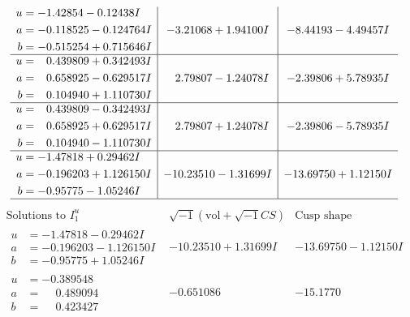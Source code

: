 \documentclass[1p]{elsarticle_modified}
\theoremstyle{definition}
\newcommand{\I}{\sqrt{-1}}
\begin{document}
$$\begin{array}{c|c|c}
\begin{aligned}
u &= -1.42854 - 0.12438 I \\
a &= -0.118525 - 0.124764 I \\
b &= -0.515254 + 0.715646 I\end{aligned}
 & -3.21068 + 1.94100 I & -8.44193 - 4.49457 I \\ \hline\begin{aligned}
u &= \phantom{-}0.439809 + 0.342493 I \\
a &= \phantom{-}0.658925 - 0.629517 I \\
b &= \phantom{-}0.104940 + 1.110730 I\end{aligned}
 & \phantom{-}2.79807 - 1.24078 I & -2.39806 + 5.78935 I \\ \hline\begin{aligned}
u &= \phantom{-}0.439809 - 0.342493 I \\
a &= \phantom{-}0.658925 + 0.629517 I \\
b &= \phantom{-}0.104940 - 1.110730 I\end{aligned}
 & \phantom{-}2.79807 + 1.24078 I & -2.39806 - 5.78935 I \\ \hline\begin{aligned}
u &= -1.47818 + 0.29462 I \\
a &= -0.196203 + 1.126150 I \\
b &= -0.95775 - 1.05246 I\end{aligned}
 & -10.23510 - 1.31699 I & -13.69750 + 1.12150 I\\
 \hline 
 \end{array}$$\newpage$$\begin{array}{c|c|c}  
\text{Solutions to }I^u_{1}& \I (\text{vol} + \sqrt{-1}CS) & \text{Cusp shape}\\
 \hline 
\begin{aligned}
u &= -1.47818 - 0.29462 I \\
a &= -0.196203 - 1.126150 I \\
b &= -0.95775 + 1.05246 I\end{aligned}
 & -10.23510 + 1.31699 I & -13.69750 - 1.12150 I \\ \hline\begin{aligned}
u &= -0.389548\phantom{ +0.000000I} \\
a &= \phantom{-}0.489094\phantom{ +0.000000I} \\
b &= \phantom{-}0.423427\phantom{ +0.000000I}\end{aligned}
 & -0.651086\phantom{ +0.000000I} & -15.1770\phantom{ +0.000000I} \\ \hline\begin{aligned}

\end{aligned}
\end{array}$$
\end{document}
